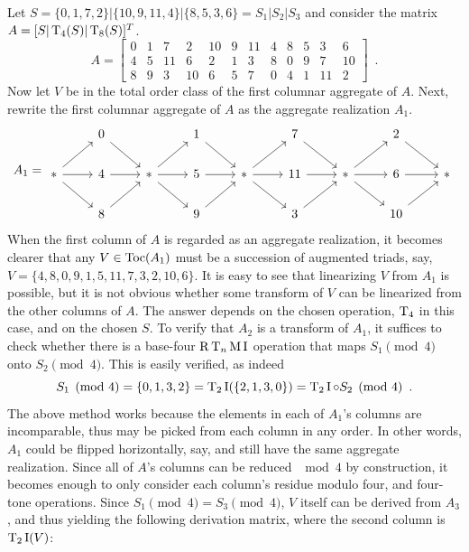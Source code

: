 \begin{example}
    \cite[226, 227]{Starr1984}
    Let $S = \{ 0, 1, 7, 2 \} | \{ 10, 9, 11, 4 \} | \{ 8, 5, 3, 6 \} = S_1 | S_2 | S_3$ and consider the matrix $A = [S | \operatorname{T}_4(S) | \operatorname{T}_8(S)]^T$.
    \begin{equation}
        A = \left[
        \begin{array}{cccc|cccc|cccc}
        	0 & 1 & 7 & 2 & 10 & 9 & 11 & 4 & 8 & 5 & 3 & 6 \\
        	4 & 5 & 11 & 6 & 2 & 1 & 3 & 8 & 0 & 9 & 7 & 10 \\
        	8 & 9 & 3 & 10 & 6 & 5 & 7 & 0 & 4 & 1 & 11 & 2
        \end{array}
        \right] \enspace.
    \end{equation}
    Now let $V$ be in the total order class of the first columnar aggregate of $A$. Next, rewrite the first columnar aggregate of $A$ as the aggregate realization $A_1$.
    \begin{equation}
        A_1 = \begin{tikzcd}
            & 0 \arrow[dr] && 1 \arrow[dr] && 7 \arrow[dr] && 2 \arrow[dr] & \\
            * \arrow[r] \arrow[dr] \arrow[ur] & 4 \arrow[r] & * \arrow[r] \arrow[dr] \arrow[ur] & 5 \arrow[r] & * \arrow[r] \arrow[dr] \arrow[ur] & 11 \arrow[r] & * \arrow[r] \arrow[dr] \arrow[ur] & 6 \arrow[r] & * \\
            & 8 \arrow[ur] && 9 \arrow[ur] && 3 \arrow[ur] && 10 \arrow[ur] &
        \end{tikzcd}
    \end{equation}
    When the first column of $A$ is regarded as an aggregate realization, it becomes clearer that any $V \in \operatorname{Toc}(A_1)$ must be a succession of augmented triads, say, $V = \{ 4, 8, 0, 9, 1, 5, 11, 7, 3, 2, 10, 6 \}$. It is easy to see that linearizing $V$ from $A_1$ is possible, but it is not obvious whether some transform of $V$ can be linearized from the other columns of $A$. The answer depends on the chosen operation, $\operatorname{T}_4$ in this case, and on the chosen $S$. To verify that $A_2$ is a transform of $A_1$, it suffices to check whether there is a base-four $\operatorname{R}\operatorname{T}_n\operatorname{M}\operatorname{I}$ operation that maps $S_1 \pmod 4$ onto $S_2 \pmod 4$. This is easily verified, as indeed
    \begin{equation}
        S_1 \pmod 4 = \{ 0, 1, 3, 2 \} = \operatorname{T}_2\operatorname{I}(\{ 2, 1, 3, 0 \}) = \operatorname{T}_2\operatorname{I} \circ S_2 \pmod 4 \enspace.
    \end{equation}
    The above method works because the elements in each of $A_1$'s columns are incomparable, thus may be picked from each column in any order. In other words, $A_1$ could be flipped horizontally, say, and still have the same aggregate realization. Since all of $A$'s columns can be reduced $\mod 4$ by construction, it becomes enough to only consider each column's residue modulo four, and four-tone operations. Since $S_1 \pmod 4 = S_3 \pmod 4$, $V$ itself can be derived from $A_3$, and thus yielding the following derivation matrix, where the second column is $\operatorname{T}_2\operatorname{I}(V)$:

\end{example}
